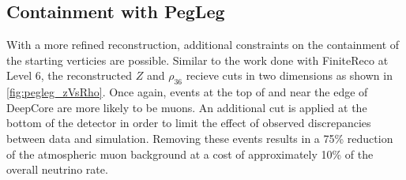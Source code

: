 \label{subsec:pegleg_containment}
\subsection{Containment with PegLeg}
With a more refined reconstruction, additional constraints on the containment of the starting verticies are possible.
Similar to the work done with FiniteReco at Level 6, the reconstructed $Z$ and $\rho_{36}$ recieve cuts in two dimensions as shown in \ref{fig:pegleg_zVsRho}.
Once again, events at the top of and near the edge of DeepCore are more likely to be muons.
An additional cut is applied at the bottom of the detector in order to limit the effect of observed discrepancies between data and simulation.
Removing these events results in a 75\% reduction of the atmospheric muon background at a cost of approximately 10\% of the overall neutrino rate.

